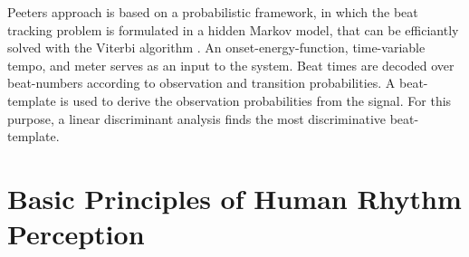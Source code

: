 \documentclass{scrartcl}
\begin{document}
Peeters \cite{Peeters2009} approach is based on a probabilistic framework, in which the beat tracking problem is formulated in a hidden Markov model, that can be efficiantly solved with the Viterbi algorithm \cite{Viterbi1967}. An onset-energy-function, time-variable tempo, and meter serves as an input to the system. Beat times are decoded over beat-numbers according to observation and transition probabilities. A beat-template is used to derive the observation probabilities from the signal. For this purpose, a linear discriminant analysis finds the most discriminative beat-template. 


\newpage
\section{Basic Principles of Human Rhythm Perception}
\label{sec:perception}
\end{document}
